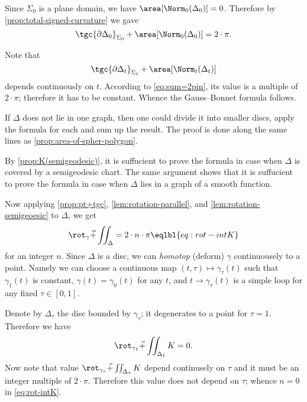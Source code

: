 Since $\Sigma_0$ is a plane domain, we have $\area[\Norm_0(\Delta_0)]=0$.
Therefore by \ref{prop:total-signed-curvature} we gave 
\[\tgc{\partial\Delta_0}_{\Sigma_0}+\area[\Norm_0(\Delta_0)]=2\cdot \pi.\]

Note that 
\[\tgc{\partial\Delta_t}_{\Sigma_t}+\area[\Norm_t(\Delta_t)]\]
depends continuously on $t$.
According to \ref{eq:sum=2pin}, its value is a multiple of $2\cdot\pi$;
therefore it has to be constant.
Whence the Gauss--Bonnet formula follows.

If $\Delta$ does not lie in one graph, then one could divide it into smaller discs, apply the formula for each and sum up the result.
The proof is done along the same lines as \ref{prop:area-of-spher-polygon}.

By \ref{prop:K(semigeodesic)},
it is suffucient to prove the formula in case when $\Delta$ is covered by a semigeodesic chart.
The same argument shows that it is suffucient to prove the formula in case when $\Delta$ lies in a graph of a smooth function.


Now applying
\ref{prop:pt+tgc},
\ref{lem:rotation-parallel},
and \ref{lem:rotation-semigeoesic} to $\Delta$, we
get
\[\rot_\gamma\vec+\iint_{\Delta}=2\cdot n\cdot \pi
\eqlbl{eq:rot-intK}\]
for an integer $n$.
Since $\Delta$ is a disc, we can \emph{homotop} (deform) $\gamma$ continuousely to a point.
Namely we can choose a continuous map $(t,\tau)\mapsto \gamma_\tau(t)$ such that $\gamma_1(t)$ is constant,
$\gamma(t)=\gamma_0(t)$ for any $t$,
and $t\to \gamma_\tau(t)$ is a simple loop for any fixed $\tau\in [0,1]$.

Denote by $\Delta_\tau$ the disc bounded by $\gamma_\tau$;
it degenerates to a point for $\tau=1$.
Therefore we have 
\[\rot_{\gamma_1}\vec+\iint_{\Delta_1}K=0.\]
Now note that value $\rot_{\gamma_\tau}\vec+\iint_{\Delta_\tau}K$ depend continusely on $\tau$ and it must be an integer multiple of $2\cdot\pi$.
Therefore this value does not depend on $\tau$;
whence $n=0$ in \ref{eq:rot-intK}. 































